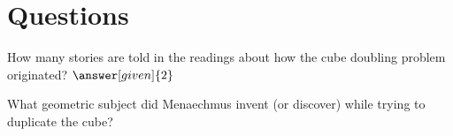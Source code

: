 \documentclass{ximera}
\begin{document}




\section{Questions}

\begin{question}
How many stories are told in the readings about how the cube doubling problem originated?  $\answer[given]{2}$
\end{question}



\begin{question}
What geometric subject did Menaechmus invent (or discover) while trying to duplicate the cube?
\begin{multipleChoice}
\end{multipleChoice}
\end{question}


\end{document}
